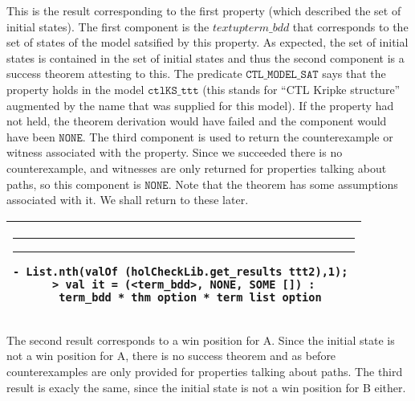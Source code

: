 \documentclass{article}
\makeatletter
\newlength{\hsbw}
\newcounter{sessioncount}
\newcommand\MLSpacing{13pt}
\newenvironment{session}{\begin{flushleft}
 \begin{tabular}{@{}|c@{}|@{}}\hline 
 \begin{minipage}[b]{\hsbw}
 \vspace*{-.5pt}
 \begin{flushright}
 \rule{0.01in}{.15in}\rule{0.3in}{0.01in}\hspace{-0.35in}
 \raisebox{0.04in}{\makebox[0.3in][c]{\footnotesize\sl \thesessioncount}}
 \end{flushright}
 \vspace*{-.45in}
 \begingroup\small\baselineskip\MLSpacing}{\endgroup\end{minipage}\\ \hline 
 \end{tabular}
 \end{flushleft}
 \stepcounter{sessioncount}}
\makeatother
\begin{document}
This is the result corresponding to the first property (which described the set of initial states).  The first component is the \(textup{term\_bdd}\) that corresponds to the set of states of the model satsified by this property. As expected, the set of initial states is contained in the set of initial states and thus the second component is a success theorem attesting to this. The predicate \( \mathtt{CTL\_MODEL\_SAT} \) says that the property holds in the model \( \mathtt{ctlKS\_ttt}\) (this stands for ``CTL Kripke structure'' augmented by the name that was supplied for this model). If the property had not held, the theorem derivation would have failed and the component would have been \( \mathtt{NONE}\). The third component is used to return the counterexample or witness associated with the property. Since we succeeded there is no counterexample, and witnesses are only returned for properties talking about paths, so this component is \( \mathtt{NONE}\). Note that the theorem has some assumptions associated with it. We shall return to these later. 

\begin{session}\begin{verbatim}
- List.nth(valOf (holCheckLib.get_results ttt2),1); 
> val it = (<term_bdd>, NONE, SOME []) :
  term_bdd * thm option * term list option
\end{verbatim}\end{session}

The second result corresponds to a win position for A. Since the initial state is not a win position for A, there is no success theorem and as before counterexamples are only provided for properties talking about paths. The third result is exacly the same, since the initial state is not a win position for B either.
 
\end{document}
